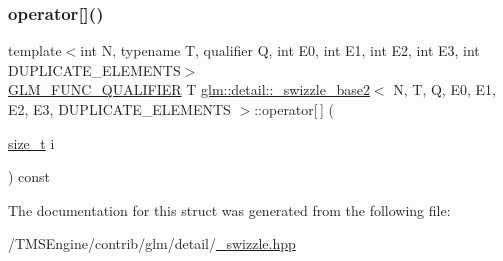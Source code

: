 \mbox{\label{structglm_1_1detail_1_1__swizzle__base2_a0e341ddb30329eabeac3361833e45cd0}} 
\subsubsection{\texorpdfstring{operator[]()}{operator[]()}\hspace{0.1cm}{\footnotesize\ttfamily [2/2]}}
{\footnotesize\ttfamily template$<$int N, typename T, qualifier Q, int E0, int E1, int E2, int E3, int D\+U\+P\+L\+I\+C\+A\+T\+E\+\_\+\+E\+L\+E\+M\+E\+N\+TS$>$ \\
\hyperlink{setup_8hpp_a33fdea6f91c5f834105f7415e2a64407}{G\+L\+M\+\_\+\+F\+U\+N\+C\+\_\+\+Q\+U\+A\+L\+I\+F\+I\+ER} T \hyperlink{structglm_1_1detail_1_1__swizzle__base2}{glm\+::detail\+::\+\_\+swizzle\+\_\+base2}$<$ N, T, Q, E0, E1, E2, E3, D\+U\+P\+L\+I\+C\+A\+T\+E\+\_\+\+E\+L\+E\+M\+E\+N\+TS $>$\+::operator\mbox{[}$\,$\mbox{]} (\begin{DoxyParamCaption}\item[{\hyperlink{_s_d_l__config__winrt_8h_a7c94ea6f8948649f8d181ae55911eeaf}{size\+\_\+t}}]{i }\end{DoxyParamCaption}) const\hspace{0.3cm}{\ttfamily [inline]}}



The documentation for this struct was generated from the following file\+:\begin{DoxyCompactItemize}
\item 
/\+T\+M\+S\+Engine/contrib/glm/detail/\hyperlink{__swizzle_8hpp}{\+\_\+swizzle.\+hpp}\end{DoxyCompactItemize}
